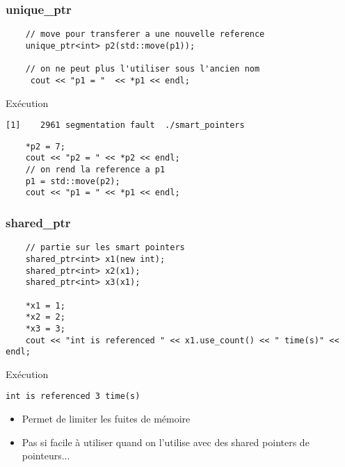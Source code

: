 \begin{frame}[fragile]
\frametitle{unique\_ptr}
\begin{lstlisting}
    // move pour transferer a une nouvelle reference 
    unique_ptr<int> p2(std::move(p1)); 

    // on ne peut plus l'utiliser sous l'ancien nom 
     cout << "p1 = "  << *p1 << endl;
\end{lstlisting}
\begin{exampleblock}{Exécution}
{\tiny
\begin{verbatim}
[1]    2961 segmentation fault  ./smart_pointers
\end{verbatim}
}
\end{exampleblock}

\begin{lstlisting}
    *p2 = 7;
    cout << "p2 = " << *p2 << endl;
    // on rend la reference a p1
    p1 = std::move(p2);
    cout << "p1 = " << *p1 << endl;
\end{lstlisting}    
\end{frame}

\begin{frame}[fragile]
\frametitle{shared\_ptr}
\begin{lstlisting}
    // partie sur les smart pointers 
    shared_ptr<int> x1(new int);
    shared_ptr<int> x2(x1);
    shared_ptr<int> x3(x1);
 
    *x1 = 1;
    *x2 = 2;
    *x3 = 3;
    cout << "int is referenced " << x1.use_count() << " time(s)" << endl;
\end{lstlisting}  
\begin{exampleblock}{Exécution}
{\tiny
\begin{verbatim}
int is referenced 3 time(s)
\end{verbatim}
}
\end{exampleblock}
\begin{itemize}
    \item Permet de limiter les fuites de mémoire 
    \item Pas si facile à utiliser quand on l'utilise avec des shared pointers de pointeurs...
\end{itemize}
\end{frame}